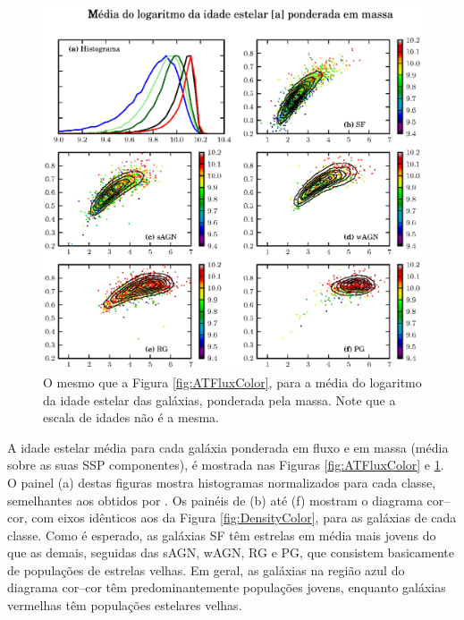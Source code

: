 \begin{figure}
	\includegraphics{figuras/uvcolor-color-at_mass-byclass.eps}
	\caption[Idade estelar média ponderada em massa no diagrama cor--cor.]
	{O mesmo que a Figura \ref{fig:ATFluxColor}, para a média do logaritmo da idade
	estelar das galáxias, ponderada pela massa. Note que a escala de idades não é a
	mesma.}
	\label{fig:ATMassColor}
\end{figure}

A idade estelar média para cada galáxia ponderada em fluxo e em massa (média
sobre as suas SSP componentes), é mostrada nas Figuras \ref{fig:ATFluxColor} e
\ref{fig:ATMassColor}. O painel (a) destas figuras mostra histogramas
normalizados para cada classe, semelhantes aos obtidos por \citet[figura
10]{CidFernandes2011}. Os painéis de (b) até (f) mostram o diagrama cor--cor,
com eixos idênticos aos da Figura \ref{fig:DensityColor}, para as galáxias de
cada classe. Como é esperado, as galáxias SF têm estrelas em média mais jovens
do que as demais, seguidas das sAGN, wAGN, RG e PG, que consistem basicamente de
populações de estrelas velhas. Em geral, as galáxias na região azul do diagrama
cor--cor têm predominantemente populações jovens, enquanto galáxias vermelhas
têm populações estelares velhas.

